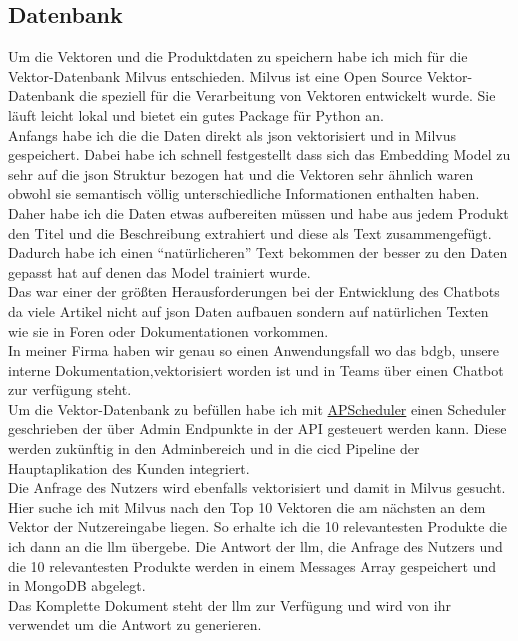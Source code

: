 \subsection{Datenbank}\label{sec:umsetzung_db}
Um die Vektoren und die Produktdaten zu speichern habe ich mich für die Vektor-Datenbank Milvus \cite{milvus} entschieden.
Milvus ist eine Open Source Vektor-Datenbank die speziell für die Verarbeitung von Vektoren entwickelt wurde.
Sie läuft leicht lokal und bietet ein gutes Package für Python an.\\
Anfangs habe ich die die Daten direkt als \gls{json} vektorisiert und in Milvus gespeichert. Dabei habe ich schnell festgestellt dass sich das Embedding Model
zu sehr auf die \gls{json} Struktur bezogen hat und die Vektoren sehr ähnlich waren obwohl sie semantisch völlig unterschiedliche Informationen enthalten haben.\\
Daher habe ich die Daten etwas aufbereiten müssen und habe aus jedem Produkt den Titel und die Beschreibung extrahiert und diese als Text zusammengefügt.
Dadurch habe ich einen \enquote{natürlicheren} Text bekommen der besser zu den Daten gepasst hat auf denen das Model trainiert wurde.\\
Das war einer der größten Herausforderungen bei der Entwicklung des Chatbots da viele Artikel nicht auf \gls{json} Daten aufbauen sondern auf natürlichen Texten wie sie
in Foren oder Dokumentationen vorkommen.\\
In meiner Firma haben wir genau so einen Anwendungsfall wo das \gls{bdgb}, unsere interne Dokumentation,vektorisiert worden ist und in Teams über einen Chatbot zur verfügung steht.\\
Um die Vektor-Datenbank zu befüllen habe ich mit \href{https://apscheduler.readthedocs.io/en/3.x/}{APScheduler} einen Scheduler geschrieben der über Admin Endpunkte in der API gesteuert werden kann.
Diese werden zukünftig in den Adminbereich und in die \gls{cicd} Pipeline der Hauptaplikation des Kunden integriert.\\
Die Anfrage des Nutzers wird ebenfalls vektorisiert und damit in Milvus gesucht. Hier suche ich mit Milvus nach den Top 10 Vektoren die am nächsten an dem Vektor der Nutzereingabe liegen.
So erhalte ich die 10 relevantesten Produkte die ich dann an die \gls{llm} übergebe. Die Antwort der \gls{llm}, die Anfrage des Nutzers und die 10 relevantesten Produkte werden in einem Messages Array
gespeichert und in MongoDB abgelegt.\\
Das Komplette Dokument steht der \gls{llm} zur Verfügung und wird von ihr verwendet um die Antwort zu generieren.\\
